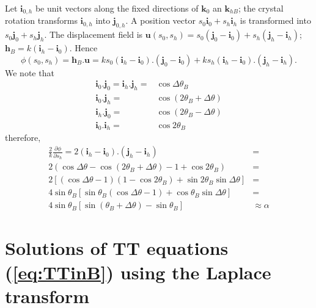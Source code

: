 \documentclass[preprint]{iucr}              %
\begin{document}
Let $\textbf{i}_{0,h}$ be unit vectors along the fixed directions of $\textbf{k}_0$ an $\textbf{k}_{hB}$; the crystal rotation transforms $\textbf{i}_{0,h}$ into $\textbf{j}_{0,h}$. A position vector $s_0\textbf{i}_0+s_h\textbf{i}_h$ is transformed into $s_0\textbf{j}_0+s_h\textbf{j}_h$. The displacement field is $\textbf{u}(s_0,s_h)=s_0(\textbf{j}_0-\textbf{i}_0)+ s_h(\textbf{j}_h-\textbf{i}_h)$; $\textbf{h}_B=k(\textbf{i}_h-\textbf{i}_0)$. Hence
\begin{equation}
    \phi(s_0,s_h)=\textbf{h}_B.\textbf{u}=k s_0(\textbf{i}_h-\textbf{i}_0).(\textbf{j}_0-\textbf{i}_0) + 
    k s_h(\textbf{i}_h-\textbf{i}_0).(\textbf{j}_h-\textbf{i}_h). \nonumber
\end{equation}
We note that 
\begin{subequations}
\begin{align}
    \textbf{i}_0.\textbf{j}_0=\textbf{i}_h.\textbf{j}_h=&\cos\Delta\theta_B \nonumber \\
    \textbf{i}_0.\textbf{j}_h=&\cos(2\theta_B +\Delta\theta) \nonumber \\
    \textbf{i}_h.\textbf{j}_0=&\cos(2\theta_B -\Delta\theta) \nonumber \\
    \textbf{i}_0.\textbf{i}_h=&\cos2\theta_B \nonumber
\end{align}
\end{subequations}
therefore, 
\begin{subequations}
\begin{align}
    \frac{2}{k}\frac{\partial\phi}{\partial s_h} =  2(\textbf{i}_h-\textbf{i}_0).(\textbf{j}_h-\textbf{i}_h)&= \nonumber\\
    2(\cos\Delta\theta - \cos(2\theta_B+\Delta\theta)-1+\cos2\theta_B)&= \nonumber\\
    2[(\cos\Delta\theta-1)(1-\cos2\theta_B)+\sin2\theta_B\sin\Delta\theta]&=\nonumber\\
    4 \sin\theta_B[\sin\theta_B(\cos\Delta\theta-1)+\cos\theta_B\sin\Delta\theta]&=\nonumber\\
    4 \sin\theta_B[\sin(\theta_B+\Delta\theta)-\sin\theta_B]&\approx
    \alpha \nonumber
\end{align}
\end{subequations}



\section{Solutions of TT equations (\ref{eq:TTinB}) using the Laplace transform}
\label{appendix:laplace}
\end{document}
